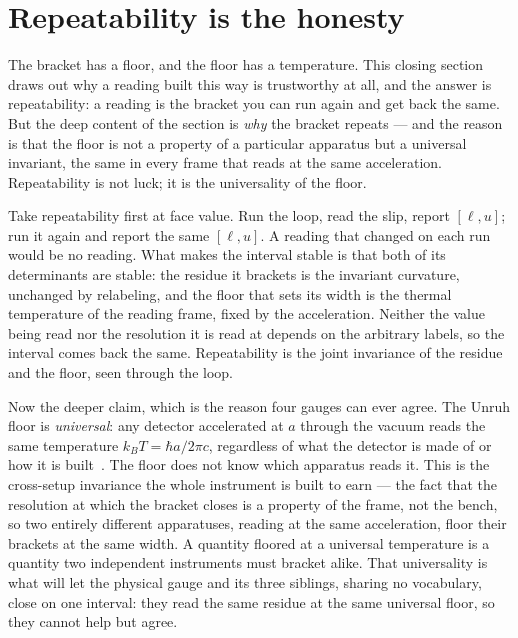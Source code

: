 \section{Repeatability is the honesty}

The bracket has a floor, and the floor has a temperature. This closing section draws out why a reading built this way is
trustworthy at all, and the answer is repeatability: a reading is the bracket you can run again and get back the same. But
the deep content of the section is \emph{why} the bracket repeats --- and the reason is that the floor is not a property of a
particular apparatus but a universal invariant, the same in every frame that reads at the same acceleration. Repeatability is
not luck; it is the universality of the floor.

Take repeatability first at face value. Run the loop, read the slip, report $[\ell, u]$; run it again and report the same
$[\ell, u]$. A reading that changed on each run would be no reading. What makes the interval stable is that both of its
determinants are stable: the residue it brackets is the invariant curvature, unchanged by relabeling, and the floor that sets
its width is the thermal temperature of the reading frame, fixed by the acceleration. Neither the value being read nor the
resolution it is read at depends on the arbitrary labels, so the interval comes back the same. Repeatability is the joint
invariance of the residue and the floor, seen through the loop.

Now the deeper claim, which is the reason four gauges can ever agree. The Unruh floor is \emph{universal}: any detector
accelerated at $a$ through the vacuum reads the same temperature $k_B T = \hbar a / 2\pi c$, regardless of what the detector
is made of or how it is built~\cite{unruh1976}. The floor does not know which apparatus reads it. This is the cross-setup
invariance the whole instrument is built to earn --- the fact that the resolution at which the bracket closes is a property
of the frame, not the bench, so two entirely different apparatuses, reading at the same acceleration, floor their brackets at
the same width. A quantity floored at a universal temperature is a quantity two independent instruments must bracket alike.
That universality is what will let the physical gauge and its three siblings, sharing no vocabulary, close on one interval:
they read the same residue at the same universal floor, so they cannot help but agree.

